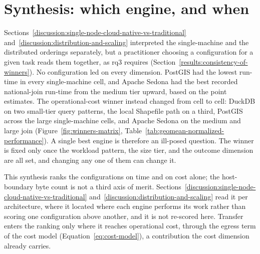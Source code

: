 \section{Synthesis: which engine, and when}
\label{discussion:synthesis-which-engine-when}

Sections~\ref{discussion:single-node-cloud-native-vs-traditional} and~\ref{discussion:distribution-and-scaling} interpreted the single-machine and the distributed orderings separately, but a practitioner choosing a configuration for a given task reads them together, as \acrshort{rq}3 requires (Section~\ref{results:consistency-of-winners}). No configuration led on every dimension. PostGIS had the lowest run-time in every single-machine cell, and Apache Sedona had the best recorded national-join run-time from the medium tier upward, based on the point estimates. The operational-cost winner instead changed from cell to cell: DuckDB on two small-tier query patterns, the local Shapefile path on a third, PostGIS across the large single-machine cells, and Apache Sedona on the medium and large join (Figure~\ref{fig:winners-matrix}, Table~\ref{tab:geomean-normalized-performance}). A single best engine is therefore an ill-posed question. The winner is fixed only once the workload pattern, the size tier, and the outcome dimension are all set, and changing any one of them can change it.

This synthesis ranks the configurations on time and on cost alone; the host-boundary byte count is not a third axis of merit. Sections~\ref{discussion:single-node-cloud-native-vs-traditional} and~\ref{discussion:distribution-and-scaling} read it per architecture, where it located where each engine performs its work rather than scoring one configuration above another, and it is not re-scored here. Transfer enters the ranking only where it reaches operational cost, through the egress term of the cost model (Equation~\ref{eq:cost-model}), a contribution the cost dimension already carries.

